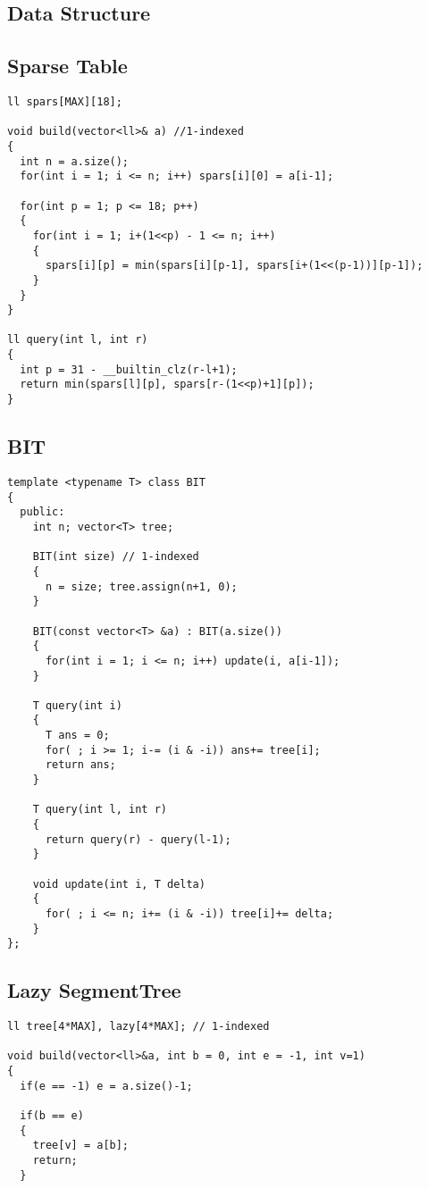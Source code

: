 \documentclass[FSZ,a4paper,onesided]{article}
\begin{document}
\begin{multicols*}{\COLS}
\section{Data Structure}
\subsection{Sparse Table}
\begin{lstlisting}
ll spars[MAX][18];

void build(vector<ll>& a) //1-indexed
{
  int n = a.size();
  for(int i = 1; i <= n; i++) spars[i][0] = a[i-1];

  for(int p = 1; p <= 18; p++)
  {
    for(int i = 1; i+(1<<p) - 1 <= n; i++)
    {
      spars[i][p] = min(spars[i][p-1], spars[i+(1<<(p-1))][p-1]);
    } 
  }
}

ll query(int l, int r)
{
  int p = 31 - __builtin_clz(r-l+1);
  return min(spars[l][p], spars[r-(1<<p)+1][p]);
}\end{lstlisting}
\subsection{BIT}
\begin{lstlisting}
template <typename T> class BIT 
{
  public:
    int n; vector<T> tree;

    BIT(int size) // 1-indexed
    {
      n = size; tree.assign(n+1, 0);
    }

    BIT(const vector<T> &a) : BIT(a.size())
    {
      for(int i = 1; i <= n; i++) update(i, a[i-1]);
    }

    T query(int i)
    {
      T ans = 0;
      for( ; i >= 1; i-= (i & -i)) ans+= tree[i];
      return ans;
    }

    T query(int l, int r)
    {
      return query(r) - query(l-1);
    }

    void update(int i, T delta)
    {
      for( ; i <= n; i+= (i & -i)) tree[i]+= delta;
    }
};\end{lstlisting}
\subsection{Lazy SegmentTree}
\begin{lstlisting}
ll tree[4*MAX], lazy[4*MAX]; // 1-indexed

void build(vector<ll>&a, int b = 0, int e = -1, int v=1)
{
  if(e == -1) e = a.size()-1;

  if(b == e)
  {
    tree[v] = a[b];
    return;
  }
  

\end{lstlisting}
\end{multicols*}
\end{document}
